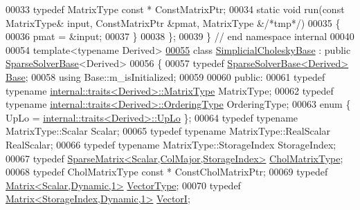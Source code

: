 \begin{DoxyCode}
00033     \textcolor{keyword}{typedef} MatrixType \textcolor{keyword}{const} * ConstMatrixPtr;
00034     \textcolor{keyword}{static} \textcolor{keywordtype}{void} run(\textcolor{keyword}{const} MatrixType& input, ConstMatrixPtr &pmat, MatrixType &\textcolor{comment}{/*tmp*/})
00035     \{
00036       pmat = &input;
00037     \}
00038   \};
00039 \} \textcolor{comment}{// end namespace internal}
00040 
00054 \textcolor{keyword}{template}<\textcolor{keyword}{typename} Derived>
\hyperlink{group___sparse_cholesky___module}{00055} \textcolor{keyword}{class }\hyperlink{group___sparse_cholesky___module_class_eigen_1_1_simplicial_cholesky_base}{SimplicialCholeskyBase} : \textcolor{keyword}{public} \hyperlink{group___sparse_core___module_class_eigen_1_1_sparse_solver_base}{SparseSolverBase}<Derived>
00056 \{
00057     \textcolor{keyword}{typedef} \hyperlink{group___sparse_core___module_class_eigen_1_1_sparse_solver_base}{SparseSolverBase<Derived>} \hyperlink{group___sparse_core___module_class_eigen_1_1_sparse_solver_base}{Base};
00058     \textcolor{keyword}{using} Base::m\_isInitialized;
00059     
00060   \textcolor{keyword}{public}:
00061     \textcolor{keyword}{typedef} \textcolor{keyword}{typename} \hyperlink{struct_eigen_1_1internal_1_1traits}{internal::traits<Derived>::MatrixType} MatrixType;
00062     \textcolor{keyword}{typedef} \textcolor{keyword}{typename} \hyperlink{struct_eigen_1_1internal_1_1traits}{internal::traits<Derived>::OrderingType} 
      OrderingType;
00063     \textcolor{keyword}{enum} \{ UpLo = \hyperlink{struct_eigen_1_1internal_1_1traits}{internal::traits<Derived>::UpLo} \};
00064     \textcolor{keyword}{typedef} \textcolor{keyword}{typename} MatrixType::Scalar Scalar;
00065     \textcolor{keyword}{typedef} \textcolor{keyword}{typename} MatrixType::RealScalar RealScalar;
00066     \textcolor{keyword}{typedef} \textcolor{keyword}{typename} MatrixType::StorageIndex StorageIndex;
00067     \textcolor{keyword}{typedef} \hyperlink{group___sparse_core___module}{SparseMatrix<Scalar,ColMajor,StorageIndex>} 
      \hyperlink{group___sparse_core___module}{CholMatrixType};
00068     \textcolor{keyword}{typedef} CholMatrixType \textcolor{keyword}{const} * ConstCholMatrixPtr;
00069     \textcolor{keyword}{typedef} \hyperlink{group___core___module}{Matrix<Scalar,Dynamic,1>} \hyperlink{group___core___module}{VectorType};
00070     \textcolor{keyword}{typedef} \hyperlink{group___core___module}{Matrix<StorageIndex,Dynamic,1>} \hyperlink{group___core___module}{VectorI};

\end{DoxyCode}
